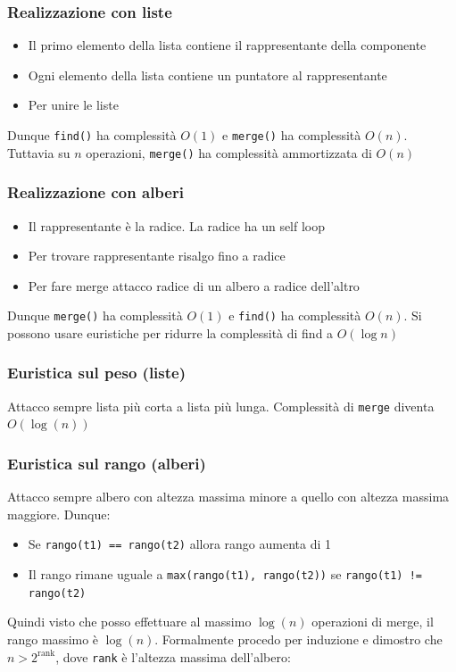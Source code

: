 \subsubsection{Realizzazione con liste}
\begin{itemize}
	\item Il primo elemento della lista contiene il rappresentante della componente
	\item Ogni elemento della lista contiene un puntatore al rappresentante
	\item Per unire le liste
\end{itemize}
Dunque \verb|find()| ha complessità $ O(1) $ e \verb|merge()| ha complessità $ O(n) $. Tuttavia su $ n $ operazioni, \verb|merge()| ha complessità ammortizzata di $ O\left(n\right) $
\subsubsection{Realizzazione con alberi}
\begin{itemize}
	\item Il rappresentante è la radice. La radice ha un self loop
	\item Per trovare rappresentante risalgo fino a radice
	\item Per fare merge attacco radice di un albero a radice dell'altro
\end{itemize}
Dunque \verb|merge()| ha complessità $ O(1) $ e \verb|find()| ha complessità $ O(n) $. Si possono usare euristiche per ridurre la complessità di find a $ O\left(\log n\right) $
\subsubsection{Euristica sul peso (liste)}
Attacco sempre lista più corta a lista più lunga. Complessità di \verb|merge| diventa $ O\left(\log \left(n\right)\right) $
\subsubsection{Euristica sul rango (alberi)}
Attacco sempre albero con altezza massima minore a quello con altezza massima maggiore. Dunque:
\begin{itemize}
	\item Se \verb|rango(t1) == rango(t2)| allora rango aumenta di 1
	\item Il rango rimane uguale a \verb|max(rango(t1), rango(t2))| se \verb|rango(t1) !=  rango(t2)|
\end{itemize}
Quindi visto che posso effettuare al massimo $ \log \left(n\right) $ operazioni di merge, il rango massimo è $ \log \left(n\right) $. Formalmente procedo per induzione e dimostro che $ n > 2^{\operatorname{rank}} $, dove \verb|rank| è l'altezza massima dell'albero:


